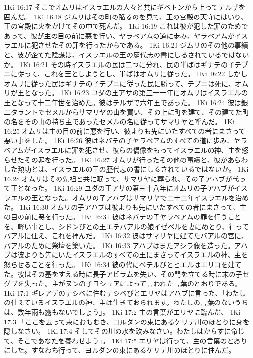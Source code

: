 1Ki 16:17  そこでオムリはイスラエルの人々と共にギベトンから上ってテルザを囲んだ。
1Ki 16:18  ジムリはその町の陥るのを見て、王の宮殿の天守にはいり、王の宮殿に火をかけてその中で死んだ。
1Ki 16:19  これは彼が犯した罪のためであって、彼が主の目の前に悪を行い、ヤラベアムの道に歩み、ヤラベアムがイスラエルに犯させたその罪を行ったからである。
1Ki 16:20  ジムリのその他の事績と、彼が企てた陰謀は、イスラエルの王の歴代志の書にしるされているではないか。
1Ki 16:21  その時イスラエルの民は二つに分れ、民の半ばはギナテの子テブニに従って、これを王としようとし、半ばはオムリに従った。
1Ki 16:22  しかしオムリに従った民はギナテの子テブニに従った民に勝って、テブニは死に、オムリが王となった。
1Ki 16:23  ユダの王アサの第三十一年にオムリはイスラエルの王となって十二年世を治めた。彼はテルザで六年王であった。
1Ki 16:24  彼は銀二タラントでセメルからサマリヤの山を買い、その上に町を建て、その建てた町の名をその山の持ち主であったセメルの名に従ってサマリヤと呼んだ。
1Ki 16:25  オムリは主の目の前に悪を行い、彼よりも先にいたすべての者にまさって悪い事をした。
1Ki 16:26  彼はネバテの子ヤラベアムのすべての道に歩み、ヤラベアムがイスラエルに罪を犯させ、彼らの偶像をもってイスラエルの神、主を怒らせたその罪を行った。
1Ki 16:27  オムリが行ったその他の事績と、彼があらわした勲功とは、イスラエルの王の歴代志の書にしるされているではないか。
1Ki 16:28  オムリはその先祖と共に眠って、サマリヤに葬られ、その子アハブが代って王となった。
1Ki 16:29  ユダの王アサの第三十八年にオムリの子アハブがイスラエルの王となった。オムリの子アハブはサマリヤで二十二年イスラエルを治めた。
1Ki 16:30  オムリの子アハブは彼よりも先にいたすべての者にまさって、主の目の前に悪を行った。
1Ki 16:31  彼はネバテの子ヤラベアムの罪を行うことを、軽い事とし、シドンびとの王エテバアルの娘イゼベルを妻にめとり、行ってバアルに仕え、これを拝んだ。
1Ki 16:32  彼はサマリヤに建てたバアルの宮に、バアルのために祭壇を築いた。
1Ki 16:33  アハブはまたアシラ像を造った。アハブは彼よりも先にいたイスラエルのすべての王にまさってイスラエルの神、主を怒らせることを行った。
1Ki 16:34  彼の代にベテルびとヒエルはエリコを建てた。彼はその基をすえる時に長子アビラムを失い、その門を立てる時に末の子セグブを失った。主がヌンの子ヨシュアによって言われた言葉のとおりである。
1Ki 17:1  ギレアデのテシベに住むテシベびとエリヤはアハブに言った、「わたしの仕えているイスラエルの神、主は生きておられます。わたしの言葉のないうちは、数年雨も露もないでしょう」。
1Ki 17:2  主の言葉がエリヤに臨んだ、
1Ki 17:3  「ここを去って東におもむき、ヨルダンの東にあるケリテ川のほとりに身を隠しなさい。
1Ki 17:4  そしてその川の水を飲みなさい。わたしはからすに命じて、そこであなたを養わせよう」。
1Ki 17:5  エリヤは行って、主の言葉のとおりにした。すなわち行って、ヨルダンの東にあるケリテ川のほとりに住んだ。
